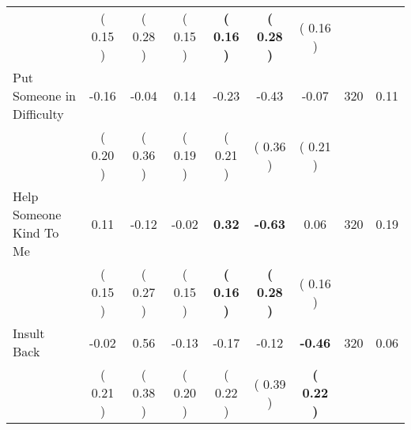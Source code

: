 \begin{tabular}{lcccccccc}
 & (     0.15 ) & (     0.28 ) & (     0.15 ) & \textbf{(     0.16 )} & \textbf{(     0.28 )} & (     0.16 ) & \\
Put Someone in Difficulty &     -0.16 &     -0.04 &      0.14 &     -0.23 &     -0.43 &     -0.07 & 320 &       0.11 \\ 
 & (     0.20 ) & (     0.36 ) & (     0.19 ) & (     0.21 ) & (     0.36 ) & (     0.21 ) & \\
Help Someone Kind To Me &      0.11 &     -0.12 &     -0.02 & \textbf{     0.32} & \textbf{    -0.63} &      0.06 & 320 &       0.19 \\ 
 & (     0.15 ) & (     0.27 ) & (     0.15 ) & \textbf{(     0.16 )} & \textbf{(     0.28 )} & (     0.16 ) & \\
Insult Back &     -0.02 &      0.56 &     -0.13 &     -0.17 &     -0.12 & \textbf{    -0.46} & 320 &       0.06 \\ 
 & (     0.21 ) & (     0.38 ) & (     0.20 ) & (     0.22 ) & (     0.39 ) & \textbf{(     0.22 )} & \\
\bottomrule
\end{tabular}

